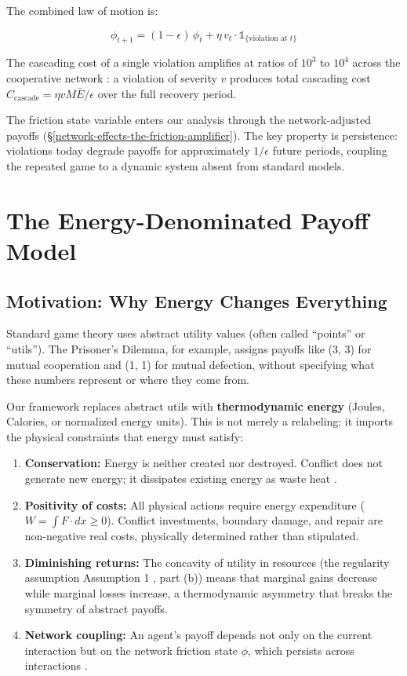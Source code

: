 \documentclass[11pt]{article}
\theoremstyle{plain}
\theoremstyle{definition}
\theoremstyle{remark}
\let\origsection\section
\renewcommand{\section}{\needspace{12\baselineskip}\origsection}
\let\origsubsection\subsection
\renewcommand{\subsection}{\needspace{7\baselineskip}\origsubsection}
\providecommand{\tightlist}{%
  \setlength{\itemsep}{0pt}\setlength{\parskip}{0pt}}
\begin{document}
The combined law of motion is:

\[\phi_{t+1} = (1 - \epsilon)\,\phi_t + \eta\,v_t \cdot \mathds{1}_{\{\text{violation at } t\}}\]

The cascading cost of a single violation amplifies at ratios of \(10^3\)
to \(10^4\) across the cooperative network \citep{TC-IV}: a violation of
severity \(v\) produces total cascading cost
\(C_{\text{cascade}} = \eta v M \bar{E} / \epsilon\) over the full
recovery period.

The friction state variable enters our analysis through the
network-adjusted payoffs
(§\ref{network-effects-the-friction-amplifier}). The key property is
persistence: violations today degrade payoffs for approximately
\(1/\epsilon\) future periods, coupling the repeated game to a dynamic
system absent from standard models.

\section{The Energy-Denominated Payoff
Model}\label{the-energy-denominated-payoff-model}

\subsection{Motivation: Why Energy Changes
Everything}\label{motivation-why-energy-changes-everything}

Standard game theory uses abstract utility values (often called
``points'' or ``utils''). The Prisoner's Dilemma, for example, assigns
payoffs like (3, 3) for mutual cooperation and (1, 1) for mutual
defection, without specifying what these numbers represent or where they
come from.

Our framework replaces abstract utils with \textbf{thermodynamic energy}
(Joules, Calories, or normalized energy units). This is not merely a
relabeling: it imports the physical constraints that energy must
satisfy:

\begin{enumerate}
\def\labelenumi{\arabic{enumi}.}
\tightlist
\item
  \textbf{Conservation:} Energy is neither created nor destroyed.
  Conflict does not generate new energy; it dissipates existing energy
  as waste heat \citep{TC-IV}.
\item
  \textbf{Positivity of costs:} All physical actions require energy
  expenditure (\(W = \int F \cdot dx \geq 0\)). Conflict investments,
  boundary damage, and repair are non-negative real costs, physically
  determined rather than stipulated.
\item
  \textbf{Diminishing returns:} The concavity of utility in resources
  (the regularity assumption Assumption 1 \citep{TC-I}, part (b)) means
  that marginal gains decrease while marginal losses increase, a
  thermodynamic asymmetry that breaks the symmetry of abstract payoffs.
\item
  \textbf{Network coupling:} An agent's payoff depends not only on the
  current interaction but on the network friction state \(\phi\), which
  persists across interactions \citep{TC-IV}.
\end{enumerate}
\end{document}
